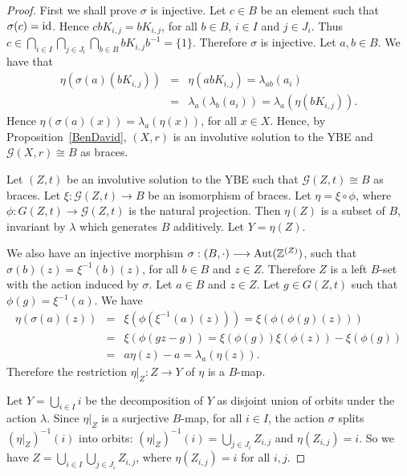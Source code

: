 \begin{proof}
	First we shall prove  $\sigma$ is injective. Let $c\in B$ be an
	element such that $\sigma(c)=\operatorname{id}$. Hence $cbK_{i,j}=bK_{i,j}$, for
	all $b\in B$, $i\in I$ and $j\in J_i$. Thus $c\in \bigcap_{i\in
		I}\bigcap_{j\in J_i}\bigcap_{b\in B} bK_{i,j}b^{-1}=\{ 1\}$.
	Therefore $\sigma$ is injective. Let $a,b\in B$. We have that
	\begin{eqnarray*}\eta(\sigma(a)(bK_{i,j}))&=&\eta(abK_{i,j})=\lambda_{ab}(a_i)\\
		&=&\lambda_{a}(\lambda_{b}(a_i))=\lambda_{a}(\eta(bK_{i,j})).
	\end{eqnarray*}
	Hence $\eta(\sigma(a)(x))=\lambda_a(\eta(x))$, for all $x\in X$.
	Hence, by Proposition~\ref{BenDavid}, $(X,r)$ is an involutive solution to the
	YBE and $\mathcal{G}(X,r)\cong B$ as braces.
	
	
	Let $(Z,t)$ be an involutive solution to the YBE such that
	$\mathcal{G}(Z,t)\cong B$ as braces. Let $\xi\colon
	\mathcal{G}(Z,t)\longrightarrow B$ be an isomorphism of braces.
	Let $\eta=\xi\circ \phi$, where $\phi\colon G(Z,t)\longrightarrow
	\mathcal{G}(Z,t)$ is the natural projection. Then $\eta(Z)$ is a
	subset of $B$, invariant by $\lambda$ which generates $B$
	additively. Let $Y=\eta(Z)$.
	
	We also have an injective morphism $\sigma:
	(B,\cdot)\longrightarrow\operatorname{Aut}(\mathbb{Z}^{(Z)})$, such that
	$\sigma(b)(z)=\xi^{-1}(b)(z)$, for all $b\in B$ and $z\in Z$.
	Therefore $Z$ is a left $B$-set with the action induced by $\sigma$.
	Let $a\in B$ and $z\in Z$. Let $g\in G(Z,t)$  such that
	$\phi(g)=\xi^{-1}(a)$. We have
	\begin{eqnarray*}
		\eta(\sigma(a)(z))&=&\xi(\phi(\xi^{-1}(a)(z)))=\xi(\phi(\phi(g)(z)))\\
		&=&\xi(\phi(gz-g))=\xi(\phi(g))\xi(\phi(z))-\xi(\phi(g))\\
		&=&a\eta(z)-a=\lambda_a(\eta(z)).
	\end{eqnarray*}
	Therefore the restriction $\eta|_Z\colon Z\longrightarrow Y$ of
	$\eta$ is a $B$-map.
	
	Let $Y=\bigcup_{i\in I} i$ be the decomposition of $Y$
	as disjoint union of orbits under the action $\lambda$. Since
	$\eta|_Z$ is a surjective $B$-map, for all $i\in I$, the action
	$\sigma$ splits $(\eta|_Z)^{-1}(i)$ into orbits:
	$(\eta|_Z)^{-1}(i)=\bigcup_{j\in J_i} Z_{i,j}$ and
	$\eta(Z_{i,j})=i$. So we have $Z=\bigcup_{i\in I}\bigcup_{j\in J_i}
	Z_{i,j}$, where $\eta(Z_{i,j})=i$ for all $i,j$.
	

\end{proof}
